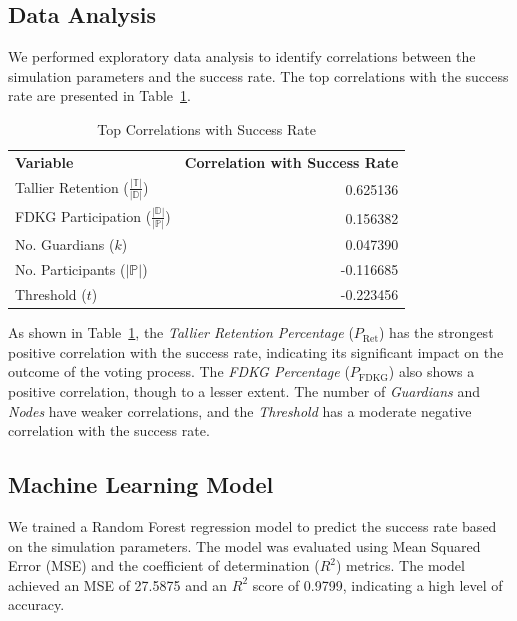 \documentclass[runningheads]{llncs}
\begin{document}
\subsection{Data Analysis}

We performed exploratory data analysis to identify correlations between the simulation parameters and the success rate. The top correlations with the success rate are presented in Table~\ref{tab:correlations}.

\begin{table}[h]
    \centering
    \caption{Top Correlations with Success Rate}
    \label{tab:correlations}
    \begin{tabular}{lr}
        \textbf{Variable} & \textbf{Correlation with Success Rate} \\
        Tallier Retention ($\frac{|\mathbb{T}|}{|\mathbb{D}|}$) & 0.625136 \\
        FDKG Participation ($\frac{|\mathbb{D}|}{|\mathbb{P}|}$) & 0.156382 \\
        No. Guardians ($k$) & 0.047390 \\
        No. Participants ($|\mathbb{P}|$) & -0.116685 \\
        Threshold ($t$)        & -0.223456 \\
    \end{tabular}
\end{table}

As shown in Table~\ref{tab:correlations}, the \textit{Tallier Retention Percentage} ($P_{\text{Ret}}$) has the strongest positive correlation with the success rate, indicating its significant impact on the outcome of the voting process. The \textit{FDKG Percentage} ($P_{\text{FDKG}}$) also shows a positive correlation, though to a lesser extent. The number of \textit{Guardians} and \textit{Nodes} have weaker correlations, and the \textit{Threshold} has a moderate negative correlation with the success rate.

\subsection{Machine Learning Model}

We trained a Random Forest regression model to predict the success rate based on the simulation parameters. The model was evaluated using Mean Squared Error (MSE) and the coefficient of determination ($R^2$) metrics. The model achieved an MSE of 27.5875 and an $R^2$ score of 0.9799, indicating a high level of accuracy.
\end{document}
